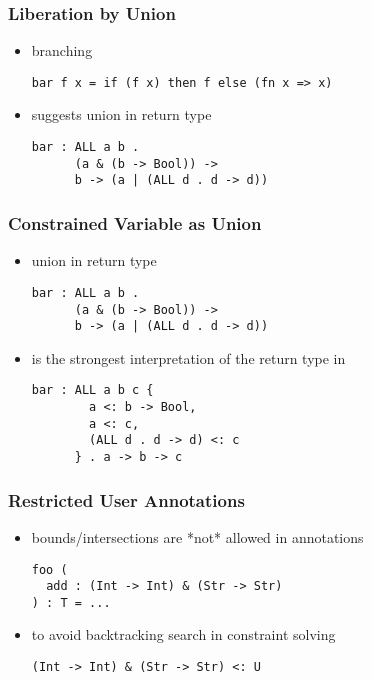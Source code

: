 \documentclass{beamer}
\begin{document}
\begin{frame}[fragile]
  \frametitle{Liberation by Union}

  \begin{itemize}
  \item branching  
  \begin{lstlisting}
bar f x = if (f x) then f else (fn x => x)
  \end{lstlisting}

  \item suggests union in return type 
  \begin{lstlisting}
bar : ALL a b . 
      (a & (b -> Bool)) -> 
      b -> (a | (ALL d . d -> d))
  \end{lstlisting}
  \end{itemize}
\end{frame}


\begin{frame}[fragile]
  \frametitle{Constrained Variable as Union}

  \begin{itemize}
  \item union in return type 
  \begin{lstlisting}
bar : ALL a b . 
      (a & (b -> Bool)) -> 
      b -> (a | (ALL d . d -> d))
  \end{lstlisting}
  \item is the strongest interpretation of the return type in 
  \begin{lstlisting}
bar : ALL a b c {
        a <: b -> Bool, 
        a <: c, 
        (ALL d . d -> d) <: c
      } . a -> b -> c
  \end{lstlisting}
  \end{itemize}
\end{frame}


\begin{frame}[fragile]
  \frametitle{Restricted User Annotations}

  \begin{itemize}
  \item bounds/intersections are *not* allowed in annotations 
  \begin{lstlisting}
foo (
  add : (Int -> Int) & (Str -> Str)
) : T = ...
  \end{lstlisting}
  \item to avoid backtracking search in constraint solving 
  \begin{lstlisting}
(Int -> Int) & (Str -> Str) <: U
  \end{lstlisting}
  \end{itemize}
\end{frame}
\end{document}

